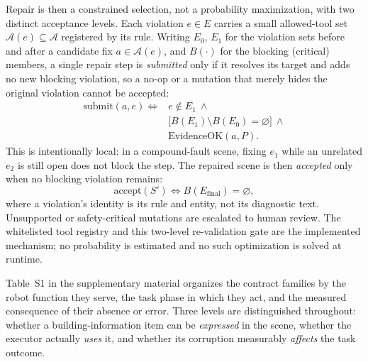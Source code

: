 Repair is then a constrained selection, not a probability maximization, with
two distinct acceptance levels. Each violation \(e\in E\) carries a small
allowed-tool set \(\mathcal{A}(e)\subseteq\mathcal{A}\) registered by its
rule. Writing \(E_0\), \(E_1\) for the violation sets before and after a
candidate fix \(a\in\mathcal{A}(e)\), and \(B(\cdot)\) for the blocking
(critical) members, a single repair step is \emph{submitted} only if it
resolves its target and adds no new blocking violation, so a no-op or a
mutation that merely hides the original violation cannot be accepted:
\begin{align}
  \mathrm{submit}(a,e) \iff {}& e\notin E_1\ \land\nonumber\\
  & \bigl[B(E_1)\setminus B(E_0)=\varnothing\bigr]\ \land\nonumber\\
  & \mathrm{EvidenceOK}(a,P) .
\end{align}
This is intentionally local: in a compound-fault scene, fixing \(e_1\) while
an unrelated \(e_2\) is still open does not block the step. The repaired
scene is then \emph{accepted} only when no blocking violation remains:
\begin{equation}
  \mathrm{accept}(S') \iff B\!\left(E_{\mathrm{final}}\right)=\varnothing,
\end{equation}
where a violation's identity is its rule and entity, not its diagnostic text.
Unsupported or safety-critical mutations are escalated to human review. The
whitelisted tool registry and this two-level re-validation gate are the
implemented mechanism; no probability is estimated and no such optimization
is solved at runtime.



Table~S1 in the supplementary material organizes the contract families by the robot function
they serve, the task phase in which they act, and the measured consequence of
their absence or error. Three levels are distinguished throughout: whether a
building-information item can be \emph{expressed} in the scene, whether the
executor actually \emph{uses} it, and whether its corruption measurably
\emph{affects} the task outcome.


